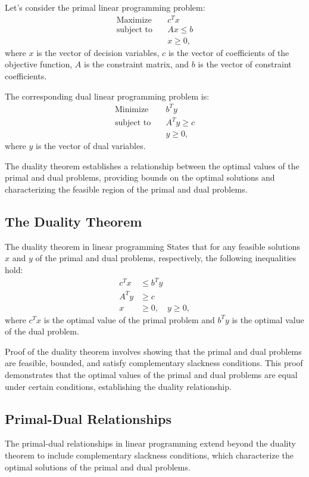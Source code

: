 \documentclass[12pt]{book} %
\begin{document}
Let's consider the primal linear programming problem:
\begin{align*}
\text{Maximize} \quad & c^T x \\
\text{subject to} \quad & Ax \leq b \\
& x \geq 0,
\end{align*}
where \(x\) is the vector of decision variables, \(c\) is the vector of coefficients of the objective function, \(A\) is the constraint matrix, and \(b\) is the vector of constraint coefficients.

The corresponding dual linear programming problem is:
\begin{align*}
\text{Minimize} \quad & b^T y \\
\text{subject to} \quad & A^T y \geq c \\
& y \geq 0,
\end{align*}
where \(y\) is the vector of dual variables.

The duality theorem establishes a relationship between the optimal values of the primal and dual problems, providing bounds on the optimal solutions and characterizing the feasible region of the primal and dual problems.

\subsection{The Duality Theorem}
The duality theorem in linear programming States that for any feasible solutions \(x\) and \(y\) of the primal and dual problems, respectively, the following inequalities hold:
\begin{align*}
c^T x & \leq b^T y \\
A^T y & \geq c \\
x & \geq 0, \quad y \geq 0,
\end{align*}
where \(c^T x\) is the optimal value of the primal problem and \(b^T y\) is the optimal value of the dual problem.

Proof of the duality theorem involves showing that the primal and dual problems are feasible, bounded, and satisfy complementary slackness conditions. This proof demonstrates that the optimal values of the primal and dual problems are equal under certain conditions, establishing the duality relationship.

\subsection{Primal-Dual Relationships}
The primal-dual relationships in linear programming extend beyond the duality theorem to include complementary slackness conditions, which characterize the optimal solutions of the primal and dual problems.
\end{document}
